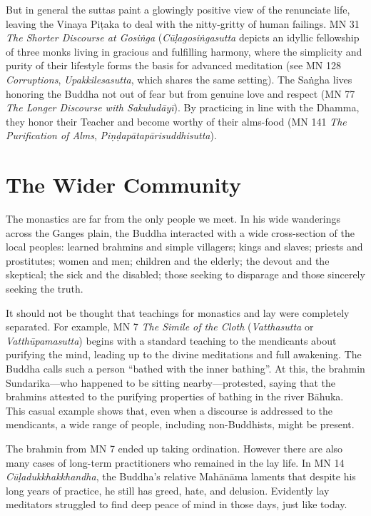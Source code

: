 \documentclass[12pt,openany]{book}%
\begin{document}
But in general the suttas paint a glowingly positive view of the renunciate life, leaving the Vinaya \textsanskrit{Piṭaka} to deal with the nitty-gritty of human failings. MN 31 \textit{The Shorter Discourse at \textsanskrit{Gosiṅga}} (\textit{\textsanskrit{Cūḷagosiṅgasutta}} depicts an idyllic fellowship of three monks living in gracious and fulfilling harmony, where the simplicity and purity of their lifestyle forms the basis for advanced meditation (see MN 128 \textit{Corruptions}, \textit{Upakkilesasutta}, which shares the same setting). The \textsanskrit{Saṅgha} lives honoring the Buddha not out of fear but from genuine love and respect (MN 77 \textit{The Longer Discourse with \textsanskrit{Sakuludāyī}}). By practicing in line with the Dhamma, they honor their Teacher and become worthy of their alms-food (MN 141 \textit{The Purification of Alms}, \textit{\textsanskrit{Piṇḍapātapārisuddhisutta}}).

\section*{The Wider Community}

The monastics are far from the only people we meet. In his wide wanderings across the Ganges plain, the Buddha interacted with a wide cross-section of the local peoples: learned brahmins and simple villagers; kings and slaves; priests and prostitutes; women and men; children and the elderly; the devout and the skeptical; the sick and the disabled; those seeking to disparage and those sincerely seeking the truth.

It should not be thought that teachings for monastics and lay were completely separated. For example, MN 7 \textit{The Simile of the Cloth} (\textit{Vatthasutta} or \textit{\textsanskrit{Vatthūpamasutta}}) begins with a standard teaching to the mendicants about purifying the mind, leading up to the divine meditations and full awakening. The Buddha calls such a person “bathed with the inner bathing”. At this, the brahmin Sundarika—who happened to be sitting nearby—protested, saying that the brahmins attested to the purifying properties of bathing in the river \textsanskrit{Bāhuka}. This casual example shows that, even when a discourse is addressed to the mendicants, a wide range of people, including non-Buddhists, might be present.

The brahmin from MN 7 ended up taking ordination. However there are also many cases of long-term practitioners who remained in the lay life. In MN 14 \textit{\textsanskrit{Cūḷadukkhakkhandha}}, the Buddha’s relative \textsanskrit{Mahānāma} laments that despite his long years of practice, he still has greed, hate, and delusion. Evidently lay meditators struggled to find deep peace of mind in those days, just like today.
\end{document}

